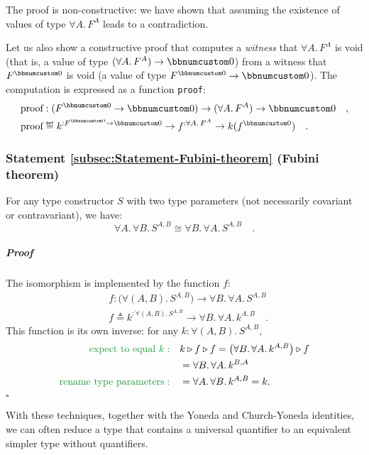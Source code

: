The proof is non-constructive: we have shown that assuming the existence
of values of type $\forall A.\,F^{A}$ leads to a contradiction. 

Let us also show a constructive proof that computes a \emph{witness}
that $\forall A.\,F^{A}$ is void (that is, a value of type $(\forall A.\,F^{A})\rightarrow\bbnum 0$)
from a witness that $F^{\bbnum 0}$ is void (a value of type $F^{\bbnum 0}\rightarrow\bbnum 0$).
The computation is expressed as a function \lstinline!proof!:
\begin{align*}
 & \text{proof}:(F^{\bbnum 0}\rightarrow\bbnum 0)\rightarrow(\forall A.\,F^{A})\rightarrow\bbnum 0\quad,\\
 & \text{proof}\triangleq k^{:F^{\bbnum 0}\rightarrow\bbnum 0}\rightarrow f^{:\forall A.\,F^{A}}\rightarrow k(f^{\bbnum 0})\quad.
\end{align*}


\subsubsection{Statement \label{subsec:Statement-Fubini-theorem}\ref{subsec:Statement-Fubini-theorem}
(Fubini theorem)}

For any type constructor $S$ with two type parameters (not necessarily
covariant or contravariant), we have:
\[
\forall A.\,\forall B.\,S^{A,B}\cong\forall B.\,\forall A.\,S^{A,B}\quad.
\]


\subparagraph{Proof}

The isomorphism is implemented by the function $f$:
\begin{align*}
 & f:\big(\forall(A,B).\,S^{A,B}\big)\rightarrow\forall B.\,\forall A.\,S^{A,B}\\
 & f\triangleq k^{:\forall(A,B).\,S^{A,B}}\rightarrow\forall B.\,\forall A.\,k^{A,B}\quad.
\end{align*}
This function is its own inverse: for any $k:\forall(A,B).\,S^{A,B}$,
\begin{align*}
{\color{greenunder}\text{expect to equal }k:}\quad & k\triangleright f\triangleright f=\big(\forall B.\,\forall A.\,k^{A,B}\big)\triangleright f\\
 & =\forall B.\,\forall A.\,k^{B,A}\\
{\color{greenunder}\text{rename type parameters}:}\quad & =\forall A.\,\forall B.\,k^{A,B}=k.
\end{align*}
$\square$ 

With these techniques, together with the Yoneda and Church-Yoneda
identities, we can often reduce a type that contains a universal quantifier
to an equivalent simpler type without quantifiers.

